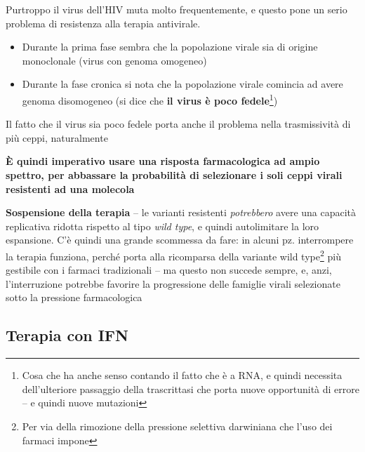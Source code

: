 \documentclass[italian,]{article}
\providecommand{\tightlist}{%
  \setlength{\itemsep}{0pt}\setlength{\parskip}{0pt}}
\newcommand{\yellowbox}[2]{\begin{tcolorbox}[title=#1,colback=yellow!5,colframe=yellow!75!red, coltitle=black]#2\end{tcolorbox}} %
\begin{document}
\yellowbox{Resistenza di HIV1 ai farmaci}{
Purtroppo il virus dell'HIV muta molto frequentemente, e questo pone un
serio problema di resistenza alla terapia antivirale.

\begin{itemize}
\tightlist
\item
  Durante la prima fase sembra che la popolazione virale sia di origine
  monoclonale (virus con genoma omogeneo)
\item
  Durante la fase cronica si nota che la popolazione virale comincia ad
  avere genoma disomogeneo (si dice che \textbf{il virus è poco
  fedele}\footnote{Cosa che ha anche senso contando il fatto che è a
    RNA, e quindi necessita dell'ulteriore passaggio della trascrittasi
    che porta nuove opportunità di errore -- e quindi nuove mutazioni})
\end{itemize}

Il fatto che il virus sia poco fedele porta anche il problema nella
trasmissività di più ceppi, naturalmente

\textbf{È quindi imperativo usare una risposta farmacologica ad ampio
spettro, per abbassare la probabilità di selezionare i soli ceppi virali
resistenti ad una molecola}

\tcblower

\textbf{Sospensione della terapia} -- le varianti resistenti
\emph{potrebbero} avere una capacità replicativa ridotta rispetto al
tipo \emph{wild type}, e quindi autolimitare la loro espansione. C'è quindi una grande scommessa da fare: in alcuni pz.
interrompere la terapia funziona, perché porta alla ricomparsa della
variante wild type\footnote{Per via della rimozione della pressione selettiva darwiniana che l'uso dei farmaci impone} più gestibile con i farmaci tradizionali -- ma questo
non succede sempre, e, anzi, l'interruzione potrebbe favorire la
progressione delle famiglie virali selezionate sotto la pressione
farmacologica
}

\hypertarget{terapia-con-ifn}{%
\subsection{Terapia con IFN}\label{terapia-con-ifn}}
\end{document}
